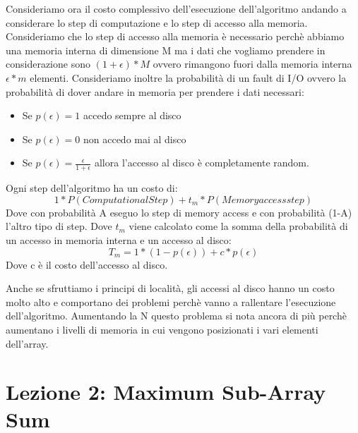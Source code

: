\documentclass[14pt]{extreport}
\begin{document}
Consideriamo ora il costo complessivo dell'esecuzione dell'algoritmo andando a considerare lo step di computazione e lo step di accesso alla memoria.
Consideriamo che lo step di accesso alla memoria è necessario perchè abbiamo una memoria interna di dimensione M ma i dati che vogliamo prendere in considerazione sono $(1+\epsilon )*M$ ovvero rimangono fuori dalla memoria interna $\epsilon * m$ elementi.
Consideriamo inoltre la probabilità di un fault di I/O ovvero la probabilità di dover andare in memoria per prendere i dati necessari:
\begin{itemize}
\item Se $p(\epsilon) = 1$ accedo sempre al disco
\item Se $p(\epsilon) = 0$ non accedo mai al disco
\item Se $p(\epsilon) =\frac{\epsilon}{1+\epsilon}$ allora l'accesso al disco è completamente random. 
\end{itemize}
Ogni step dell'algoritmo ha un costo di:
\begin{equation}
1*P(Computational Step) + t_m * P(Memory access step)
\end{equation}
Dove con probabilità A eseguo lo step di memory access e con probabilità (1-A) l'altro tipo di step.
Dove $t_m$ viene calcolato come la somma della probabilità di un accesso in memoria interna e un accesso al disco:
\begin{equation}
T_m = 1*(1-p(\epsilon)) + c*p(\epsilon)
\end{equation}
Dove c è il costo dell'accesso al disco.

Anche se sfruttiamo i principi di località, gli accessi al disco hanno un costo molto alto e comportano dei problemi perchè vanno a rallentare l'esecuzione dell'algoritmo. Aumentando la N questo problema si nota ancora di più perchè aumentano i livelli di memoria in cui vengono posizionati i vari elementi dell'array.

\chapter{Lezione 2: Maximum Sub-Array Sum}
\end{document}
